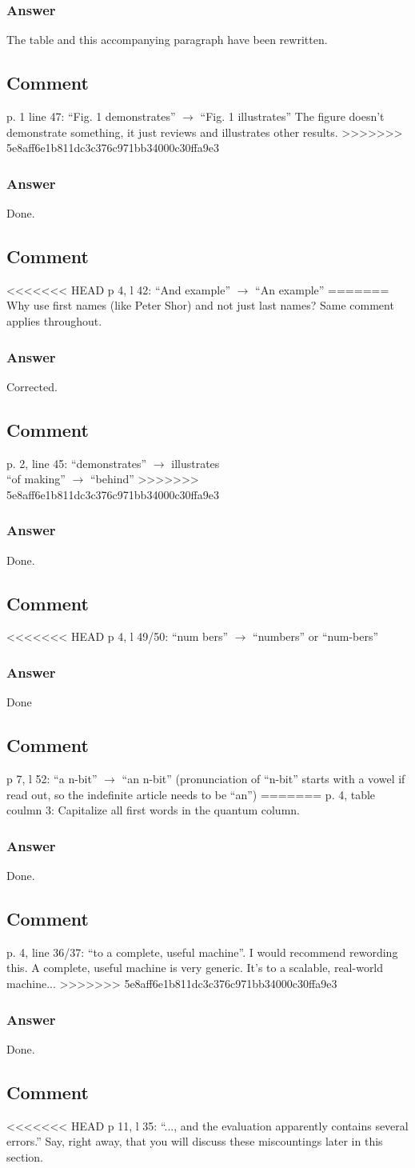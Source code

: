 \documentclass{article}
\newcommand{\comment}{\subsection{Comment}\em}
\newcommand{\answer}{\rm \subsubsection*{Answer}}
\begin{document}
\answer

The table and this accompanying paragraph have been rewritten.

\comment

p. 1 line 47: ``Fig. 1 demonstrates'' $\rightarrow$ ``Fig. 1 illustrates''  The figure doesn't demonstrate something, it just reviews and illustrates other results.
>>>>>>> 5e8aff6e1b811dc3c376c971bb34000c30ffa9e3

\answer

Done.

\comment

<<<<<<< HEAD
p 4, l 42: ``And example'' $\rightarrow$ ``An example''
=======
Why use first names (like Peter Shor) and not just last names?  Same comment applies throughout.

\answer

Corrected.

\comment

p. 2, line 45: ``demonstrates'' $\rightarrow$ illustrates\\
``of making'' $\rightarrow$ ``behind''
>>>>>>> 5e8aff6e1b811dc3c376c971bb34000c30ffa9e3

\answer

Done.

\comment

<<<<<<< HEAD
p 4, l 49/50: ``num bers'' $\rightarrow$ ``numbers'' or ``num-bers''

\answer

Done

\comment

p 7, l 52: ``a n-bit'' $\rightarrow$ ``an n-bit'' (pronunciation of ``n-bit'' starts with a vowel if read out, so the indefinite article needs to be ``an'')
=======
p. 4, table coulmn 3: Capitalize all first words in the quantum column.

\answer

Done.

\comment

p. 4, line 36/37: ``to a complete, useful machine''.  I would recommend rewording this.  A complete, useful machine is very generic.  It's to a scalable, real-world machine...
>>>>>>> 5e8aff6e1b811dc3c376c971bb34000c30ffa9e3

\answer

Done.

\comment

<<<<<<< HEAD
p 11, l 35: ``..., and the evaluation apparently contains several errors.'' Say,
right away, that you will discuss these miscountings later in this section.
\end{document}
